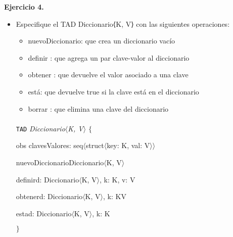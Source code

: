 \documentclass{article}
\newenvironment{tad}[1]{
	\paragraph{} \vspace*{-4mm}
	\newcommand{\obs}[2]{\texttt{obs} ##1 : ##2}

	\vspace{1ex}
	\texttt{TAD} \textit{#1} $\{$
	\par
	\tocarEspacios
}
{

\hspace{2.5mm} $\}$
\vspace{2ex}
}
\begin{document}
\textbf{Ejercicio 4.}
\begin{itemize}
    \item [a)] Especifique el TAD Diccionario⟨K, V⟩ con las siguientes operaciones:
    \begin{itemize}
        \item [a)] nuevoDiccionario: que crea un diccionario vac\'io
        \item [b)] definir : que agrega un par clave-valor al diccionario
        \item [c)] obtener : que devuelve el valor asociado a una clave
        \item [d)] est\'a: que devuelve true si la clave est\'a en el diccionario
        \item [e)] borrar : que elimina una clave del diccionario
    \end{itemize}

    \begin{tad}{Diccionario$\langle$K, V$\rangle$}
        obs clavesValores: seq$\langle$struct$\langle$key: K, val: V$\rangle$$\rangle$

        \begin{proc}{nuevoDiccionario}{}{Diccionario$\langle$K, V$\rangle$}
        \end{proc}

        \begin{proc}{definir}{\Inout d: Diccionario$\langle$K, V$\rangle$, \In k: K, \In v: V}{}
        \end{proc}

        \begin{proc}{obtener}{\In d: Diccionario$\langle$K, V$\rangle$, \In k: K}{V}
        \end{proc}

        \begin{proc}{esta}{\In d: Diccionario$\langle$K, V$\rangle$, \In k: K}{\bool}
        \end{proc}
        

\end{tad}
\end{itemize}
\end{document}
